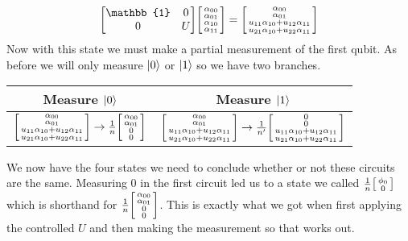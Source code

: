 \documentclass[boxes,pages]{homework}
\begin{document}
\begin{solution}
	\begin{equation*}
		\mqty[\mathbb{1} & 0 \\ 0 & U]\smqty[\alpha_{00} \\ \alpha_{01} \\ \alpha_{10} \\ \alpha_{11}] = \smqty[\alpha_{00} \\ \alpha_{01} \\ u_{11}\alpha_{10} + u_{12}\alpha_{11} \\ u_{21}\alpha_{10} + u_{22}\alpha_{11}]
	\end{equation*}
	Now with this state we must make a partial measurement of the first qubit. As before we will only measure $\ket{0}$ or $\ket{1}$ so we have two branches.
	\begin{center}
		\begin{tabular}{c@{\hskip 0.5in} c}
			Measure $\ket{0}$ & Measure $\ket{1}$ \\ \toprule
			$\smqty[\alpha_{00} \\ \alpha_{01} \\ u_{11}\alpha_{10} + u_{12}\alpha_{11} \\ u_{21}\alpha_{10} + u_{22}\alpha_{11}] \to \frac{1}{n}\smqty[\alpha_{00} \\ \alpha_{01} \\ 0 \\ 0]$ & $\smqty[\alpha_{00} \\ \alpha_{01} \\ u_{11}\alpha_{10} + u_{12}\alpha_{11} \\ u_{21}\alpha_{10} + u_{22}\alpha_{11}] \to \frac{1}{n'}\smqty[0 \\ 0 \\ u_{11}\alpha_{10} + u_{12}\alpha_{11} \\ u_{21}\alpha_{10} + u_{22}\alpha_{11}]$
		\end{tabular}
	\end{center}
	We now have the four states we need to conclude whether or not these circuits are the same. Measuring 0 in the first circuit led us to a state we called $\frac{1}{n}\smqty[\phi_0 \\ 0]$ which is shorthand for $\frac{1}{n}\smqty[\alpha_{00} \\ \alpha_{01} \\ 0 \\ 0]$. This is exactly what we got when first applying the controlled $U$ and then making the measurement so that works out.


\end{solution}
\end{document}
